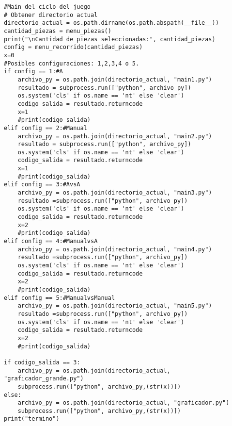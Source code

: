 \begin{lstlisting}
#Main del ciclo del juego
# Obtener directorio actual
directorio_actual = os.path.dirname(os.path.abspath(__file__))
cantidad_piezas = menu_piezas()
print("\nCantidad de piezas seleccionadas:", cantidad_piezas)
config = menu_recorrido(cantidad_piezas)
x=0
#Posibles configuraciones: 1,2,3,4 o 5.
if config == 1:#A
    archivo_py = os.path.join(directorio_actual, "main1.py")
    resultado = subprocess.run(["python", archivo_py])
    os.system('cls' if os.name == 'nt' else 'clear')
    codigo_salida = resultado.returncode
    x=1
    #print(codigo_salida)
elif config == 2:#Manual
    archivo_py = os.path.join(directorio_actual, "main2.py")
    resultado = subprocess.run(["python", archivo_py])
    os.system('cls' if os.name == 'nt' else 'clear')
    codigo_salida = resultado.returncode
    x=1
    #print(codigo_salida)
elif config == 3:#AvsA
    archivo_py = os.path.join(directorio_actual, "main3.py")
    resultado =subprocess.run(["python", archivo_py])
    os.system('cls' if os.name == 'nt' else 'clear')
    codigo_salida = resultado.returncode
    x=2
    #print(codigo_salida)
elif config == 4:#ManualvsA
    archivo_py = os.path.join(directorio_actual, "main4.py")
    resultado =subprocess.run(["python", archivo_py])
    os.system('cls' if os.name == 'nt' else 'clear')
    codigo_salida = resultado.returncode
    x=2
    #print(codigo_salida)
elif config == 5:#ManualvsManual
    archivo_py = os.path.join(directorio_actual, "main5.py")
    resultado =subprocess.run(["python", archivo_py])
    os.system('cls' if os.name == 'nt' else 'clear')
    codigo_salida = resultado.returncode
    x=2
    #print(codigo_salida)

if codigo_salida == 3:
    archivo_py = os.path.join(directorio_actual, "graficador_grande.py")
    subprocess.run(["python", archivo_py,(str(x))])
else:
    archivo_py = os.path.join(directorio_actual, "graficador.py")
    subprocess.run(["python", archivo_py,(str(x))])
print("termino")
\end{lstlisting}

